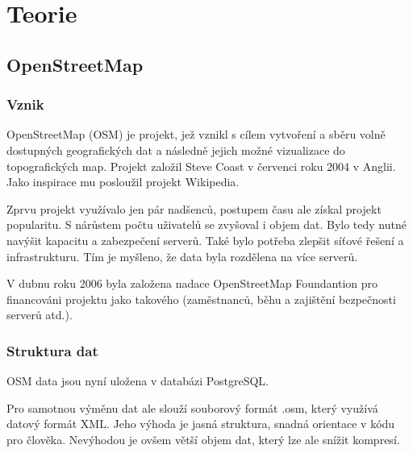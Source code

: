 \chapter{Teorie}
\label{2-Teorie}

\section{OpenStreetMap}
\label{OpenStreetMap}

\subsection{Vznik}
\label{vznik}
OpenStreetMap (OSM) je projekt, jež vznikl s cílem vytvoření a sběru 
volně dostupných geografických dat a následně jejich možné vizualizace
do topografických map. Projekt založil Steve Coast v červenci roku 
2004 v Anglii. Jako inspirace mu posloužil projekt Wikipedia.

Zprvu projekt využívalo jen pár nadšenců, postupem času ale získal
projekt popularitu. S nárůstem počtu uživatelů se zvyšoval i objem dat.
Bylo tedy nutné navýšit kapacitu a zabezpečení serverů.
Také bylo potřeba zlepšit síťové řešení a infrastrukturu.
Tím je myšleno, že data byla rozdělena na více serverů.
 

V dubnu roku 2006 byla založena nadace OpenStreetMap Foundantion pro financováni 
projektu jako takového (zaměstnanců, běhu a zajištění bezpečnosti serverů atd.). \cite{wikiOSM}


\subsection{Struktura dat}
\label{struktura dat}
OSM data jsou nyní uložena v databázi PostgreSQL. \cite{OSMserver}

Pro samotnou výměnu dat ale slouží souborový formát {.osm}, který využívá datový
formát  XML. 
Jeho výhoda je jasná struktura, snadná orientace v kódu pro člověka. 
Nevýhodou je ovšem větší objem dat, který lze ale snížit kompresí. 

